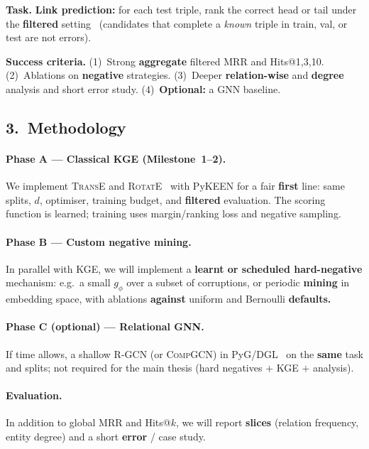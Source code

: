 \documentclass[10pt,a4paper]{article}
\begin{document}
\textbf{Task.} \textbf{Link prediction:} for each test triple, rank the correct head or tail under the \textbf{filtered} setting~\citep{bordes2013translating} (candidates that complete a \emph{known} triple in train, val, or test are not errors).

\textbf{Success criteria.} (1)~Strong \textbf{aggregate} filtered MRR and Hits@1,3,10. (2)~Ablations on \textbf{negative} strategies. (3)~Deeper \textbf{relation-wise} and \textbf{degree} analysis and short error study. (4)~\textbf{Optional:} a GNN baseline.

\subsection*{3.\ Methodology}
\paragraph{Phase A --- Classical KGE (Milestone~1--2).} We implement \textsc{TransE} and \textsc{RotatE}~\citep{sun2019rotate} with PyKEEN for a fair \textbf{first} line: same splits, $d$, optimiser, training budget, and \textbf{filtered} evaluation. The scoring function is learned; training uses margin/ranking loss and negative sampling.

\paragraph{Phase B --- Custom negative mining.} In parallel with KGE, we will implement a \textbf{learnt or scheduled hard-negative} mechanism: e.g.\ a small $g_\phi$ over a subset of corruptions, or periodic \textbf{mining} in embedding space, with ablations \textbf{against} uniform and Bernoulli \textbf{defaults.}

\paragraph{Phase C (optional) --- Relational GNN.} If time allows, a shallow \textsc{R-GCN} (or \textsc{CompGCN}) in PyG/DGL~\citep{schlichtkrull2018modeling} on the \textbf{same} task and splits; not required for the main thesis (hard negatives $+$ KGE $+$ analysis).

\paragraph{Evaluation.} In addition to global MRR and Hits@$k$, we will report \textbf{slices} (relation frequency, entity degree) and a short \textbf{error} / case study.
\end{document}

